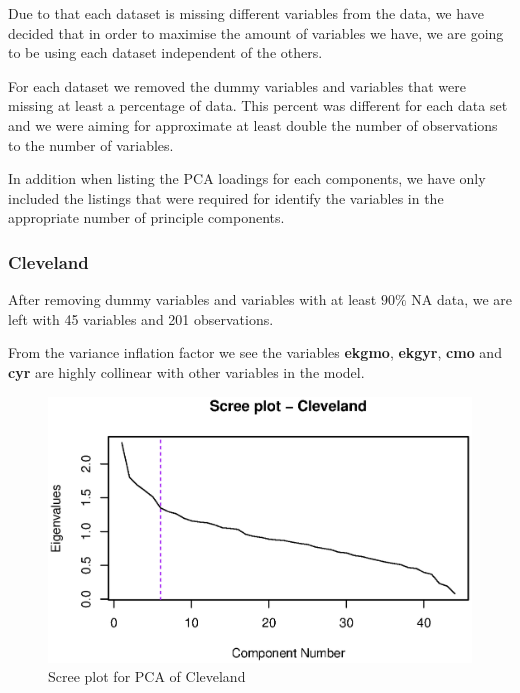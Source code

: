\documentclass[a4paper]{article}
\begin{document}
Due to that each dataset is missing different variables from the data, we have
decided that in order to maximise the amount of variables we have, we are going
to be using each dataset independent of the others.

For each dataset we removed the dummy variables and variables that were missing
at least a percentage of data. This percent was different for each data set and
we were aiming for approximate at least double the number of observations to the
number of variables.

In addition when listing the PCA loadings for each components, we have only
included the listings that were required for identify the variables in the
appropriate number of principle components.

\subsubsection{Cleveland}

After removing dummy variables and variables with at least $90\%$ NA data, we
are left with 45 variables and 201 observations.



From the variance inflation factor we see the variables \textbf{ekgmo},
\textbf{ekgyr}, \textbf{cmo} and \textbf{cyr} are highly collinear with other
variables in the model.

\begin{figure}[H]
	\begin{center}
		\includegraphics[width=12cm]{question3output/clescreeplot.eps}
	\end{center}
	\caption{Scree plot for PCA of Cleveland}
	\label{q3-cle-screeplot}
\end{figure}
\end{document}
